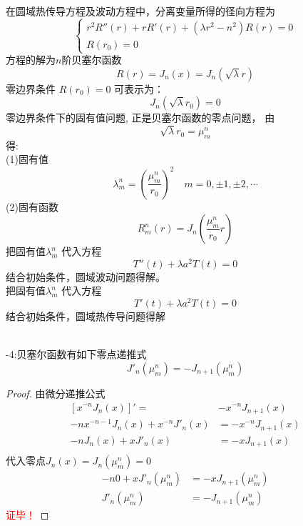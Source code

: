 在圆域热传导方程及波动方程中，分离变量所得的径向方程为
	\[\begin{cases}
		r^2 R'' (r)+r R'(r) +( \lambda r^2 -n^2)R(r)=0  \\
		R(r_0)=0
	\end{cases}  \]
	方程的解为$n$阶贝塞尔函数 $$R(r)=J_n(x) = J_n(\sqrt{\lambda}r)$$ 
	零边界条件 $R(r_0)=0$ 可表示为： $$J_n(\sqrt{\lambda}r_0)=0$$ 
	零边界条件下的固有值问题, 正是贝塞尔函数的零点问题， 由\\
	\[ \sqrt{\lambda}r_0 = \mu_{m}^{n}\]
	得:\\
	(1)固有值
	\[\lambda_m ^n =(\frac{\mu_{m}^{n}}{r_0})^2 \quad m=0,\pm 1, \pm 2, \cdots \]
	(2)固有函数
	\[R_m ^n(r) = J_n (\frac{\mu_{m}^{n}}{r_0}r) \]
	把固有值$ \lambda_m ^n  $ 代入方程
	\[T''(t)+\lambda a^2T(t)=0 \] 
	结合初始条件，圆域波动问题得解。\\
	把固有值$ \lambda_m ^n  $ 代入方程
	\[T'(t)+\lambda a^2T(t)=0 \] 
	结合初始条件，圆域热传导问题得解 \\
 ~~\\ 

\begin{proposition}-4:贝塞尔函数有如下零点递推式
	\[ J'_n(\mu_m ^n)= - J_{n+1}(\mu_m ^n)\]
	\end{proposition}
\begin{proof}
	由微分递推公式 
 	\begin{equation*}
	\begin{split}
	 \left[x^{-n} J_{n}(x)\right]'=& -x^{-n} J_{n+1}(x) \\
	 -n x^{-n-1} J_n(x) + x^{-n} J'_n(x)&= -x^{-n} J_{n+1}(x) \\
	 -n J_n(x) + x J'_n(x)&= -x J_{n+1}(x) \\
	\end{split}
\end{equation*}
代入零点$J_n(x) = J_n(\mu_m ^n) =0 $
\begin{equation*}
	\begin{split}
	 -n 0 + x J'_n(\mu_m ^n)&= -x J_{n+1}(\mu_m ^n) \\
	 J'_n(\mu_m ^n)&= - J_{n+1}(\mu_m ^n)
 	\end{split}
	\end{equation*}	
\textcolor{red}{证毕！}
\end{proof}
~~\\

